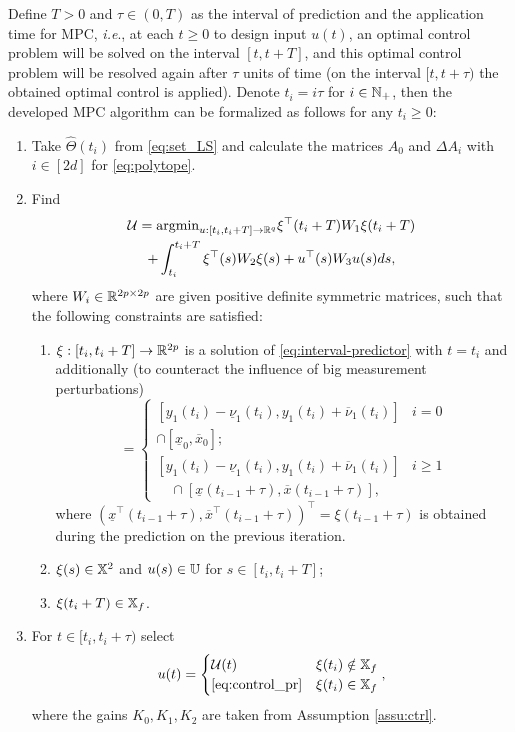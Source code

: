 \documentclass[letterpaper, 10 pt, conference]{ieeeconf}  %
\begin{document}
Define $T>0$ and $\tau\in(0,T)$ as the interval of prediction and
the application time for MPC, \emph{i.e}., at each $t\geq0$ to design
input $u(t)$, an optimal control problem will be solved on the interval
$[t,t+T]$, and this optimal control problem will be resolved again
after $\tau$ units of time (on the interval $[t,t+\tau)$ the obtained
optimal control is applied). Denote $t_{i}=i\tau$ for $i\in\mathbb{N}_{+}$,
then the developed MPC algorithm can be formalized as follows for
any $t_{i}\geq0$:
\begin{enumerate}
\item Take $\hat{\Theta}(t_{i})$ from \eqref{eq:set_LS} and calculate
the matrices $A_{0}$ and $\Delta A_{i}$ with $i\in[2d]$ for \eqref{eq:polytope}.
\item Find
\begin{gather}
\mathcal{U}=\text{argmin}_{u:[t_{i},t_{i}+T]\to\mathbb{R}^{q}}\xi^{\top}(t_{i}+T)W_{1}\xi(t_{i}+T)\label{eq:OCP}\\
+\int_{t_{i}}^{t_{i}+T}\xi^{\top}(s)W_{2}\xi(s)+u^{\top}(s)W_{3}u(s)ds,\nonumber 
\end{gather}
where $W_{i}\in\mathbb{R}^{2p\times2p}$ are given positive definite symmetric
matrices, such that the following constraints are satisfied: 
\begin{enumerate}
\item $\xi:[t_{i},t_{i}+T]\to\mathbb{R}^{2p}$ is a solution of \eqref{eq:interval-predictor}
with $t=t_{i}$ and additionally (to counteract the influence of big
measurement perturbations)
\begin{equation}
[\underline{x}(t_{i}),\overline{x}(t_{i})]=\begin{cases}
[y_{1}(t_{i})-\underline{\nu}_{1}(t_{i}),y_{1}(t_{i})+\overline{\nu}_{1}(t_{i})] & i=0\\
\cap[\underline{x}_{0},\overline{x}_{0}];\\{}
[y_{1}(t_{i})-\underline{\nu}_{1}(t_{i}),y_{1}(t_{i})+\overline{\nu}_{1}(t_{i})] & i\geq1\\
\quad\cap[\underline{x}(t_{i-1}+\tau),\overline{x}(t_{i-1}+\tau)],
\end{cases}\label{eq:update}
\end{equation}
where $(\underline{x}^{\top}(t_{i-1}+\tau),\overline{x}^{\top}(t_{i-1}+\tau))^{\top}=\xi(t_{i-1}+\tau)$
is obtained during the prediction on the previous iteration.
\item $\xi(s)\in\mathbb{X}^{2}$ and $u(s)\in\mathbb{U}$ for $s\in[t_{i},t_{i}+T]$; 
\item $\xi(t_{i}+T)\in\mathbb{X}_{f}$.
\end{enumerate}
\item For $t\in[t_{i},t_{i}+\tau)$ select
\begin{equation}
u(t)=\begin{cases}
\mathcal{U}(t) & \xi(t_{i})\notin\mathbb{X}_{f}\\
\eqref{eq:control_pr} & \xi(t_{i})\in\mathbb{X}_{f}
\end{cases},\label{eq:control}
\end{equation}
where the gains $K_{0},K_{1},K_{2}$ are taken from Assumption \ref{assu:ctrl}.
\end{enumerate}
\end{document}
